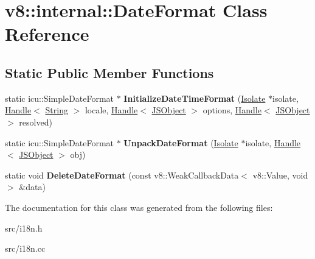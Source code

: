 \hypertarget{classv8_1_1internal_1_1_date_format}{}\section{v8\+:\+:internal\+:\+:Date\+Format Class Reference}
\label{classv8_1_1internal_1_1_date_format}
\subsection*{Static Public Member Functions}
\begin{DoxyCompactItemize}
\item 
\hypertarget{classv8_1_1internal_1_1_date_format_ada7946193453b488f277068a8c72f699}{}static icu\+::\+Simple\+Date\+Format $\ast$ {\bfseries Initialize\+Date\+Time\+Format} (\hyperlink{classv8_1_1internal_1_1_isolate}{Isolate} $\ast$isolate, \hyperlink{classv8_1_1internal_1_1_handle}{Handle}$<$ \hyperlink{classv8_1_1internal_1_1_string}{String} $>$ locale, \hyperlink{classv8_1_1internal_1_1_handle}{Handle}$<$ \hyperlink{classv8_1_1internal_1_1_j_s_object}{J\+S\+Object} $>$ options, \hyperlink{classv8_1_1internal_1_1_handle}{Handle}$<$ \hyperlink{classv8_1_1internal_1_1_j_s_object}{J\+S\+Object} $>$ resolved)\label{classv8_1_1internal_1_1_date_format_ada7946193453b488f277068a8c72f699}

\item 
\hypertarget{classv8_1_1internal_1_1_date_format_a0741eb0ed1e156d88d02a24a7133c4f2}{}static icu\+::\+Simple\+Date\+Format $\ast$ {\bfseries Unpack\+Date\+Format} (\hyperlink{classv8_1_1internal_1_1_isolate}{Isolate} $\ast$isolate, \hyperlink{classv8_1_1internal_1_1_handle}{Handle}$<$ \hyperlink{classv8_1_1internal_1_1_j_s_object}{J\+S\+Object} $>$ obj)\label{classv8_1_1internal_1_1_date_format_a0741eb0ed1e156d88d02a24a7133c4f2}

\item 
\hypertarget{classv8_1_1internal_1_1_date_format_a79757a0f61188eec67f7586cdd44aff1}{}static void {\bfseries Delete\+Date\+Format} (const v8\+::\+Weak\+Callback\+Data$<$ v8\+::\+Value, void $>$ \&data)\label{classv8_1_1internal_1_1_date_format_a79757a0f61188eec67f7586cdd44aff1}

\end{DoxyCompactItemize}


The documentation for this class was generated from the following files\+:\begin{DoxyCompactItemize}
\item 
src/i18n.\+h\item 
src/i18n.\+cc\end{DoxyCompactItemize}
